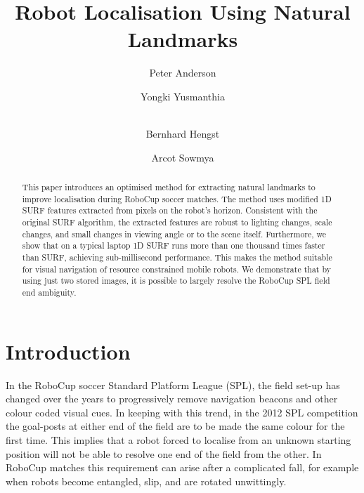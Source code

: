 \documentclass[runningheads,a4paper]{llncs}
\begin{document}
\mainmatter

\title{Robot Localisation Using Natural Landmarks}


\author{Peter Anderson \and Yongki Yusmanthia \and \\
    Bernhard Hengst \and Arcot Sowmya}



\maketitle


\begin{abstract}
This paper introduces an optimised method for extracting natural landmarks to improve localisation during RoboCup soccer matches. The method uses modified 1D SURF features extracted from pixels on the robot's horizon. Consistent with the original SURF algorithm, the extracted features are robust to lighting changes, scale changes, and small changes in viewing angle or to the scene itself. Furthermore, we show that on a typical laptop 1D SURF runs more than one thousand times faster than SURF, achieving sub-millisecond performance. This makes the method suitable for visual navigation of resource constrained mobile robots. We demonstrate that by using just two stored images, it is possible to largely resolve the RoboCup SPL field end ambiguity. 
\end{abstract}


\section{Introduction}
In the RoboCup soccer Standard Platform League (SPL), the field set-up has changed over the years to progressively remove navigation beacons and other colour coded visual cues. In keeping with this trend, in the 2012 SPL competition the goal-posts at either end of the field are to be made the same colour for the first time. This implies that a robot forced to localise from an unknown starting position will not be able to resolve one end of the field from the other. In RoboCup matches this requirement can arise after a complicated fall, for example when robots become entangled, slip, and are rotated unwittingly. 
\end{document}
